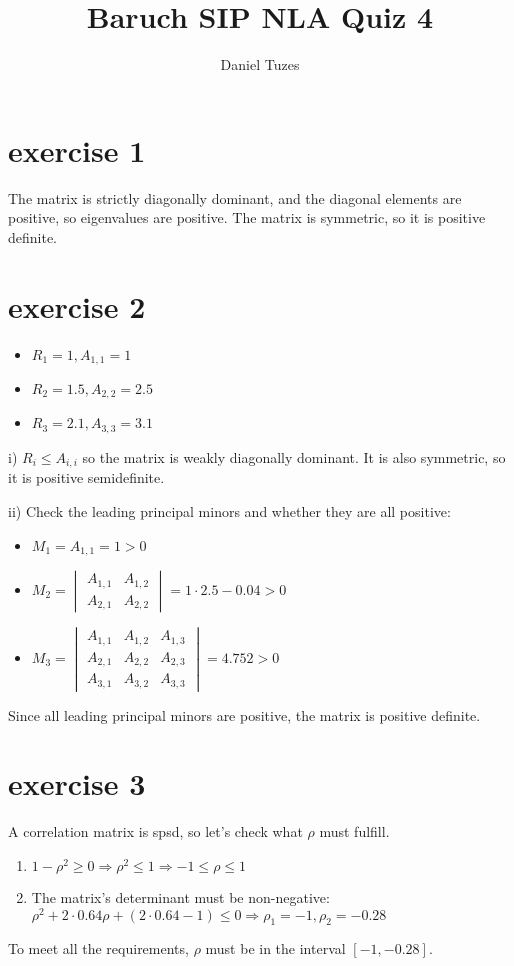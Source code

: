 \documentclass{article}
\title{Baruch SIP NLA Quiz 4}
\author{Daniel Tuzes}
\begin{document}
\maketitle

\section{exercise 1}
The matrix is strictly diagonally dominant, and the diagonal elements are positive, so eigenvalues are positive. The matrix is symmetric, so it is positive definite.

\section{exercise 2}
\begin{itemize}
    \item $R_1 = 1, A_{1,1} = 1$
    \item $R_2 = 1.5, A_{2,2} = 2.5$
    \item $R_3 = 2.1, A_{3,3} = 3.1$
\end{itemize}
i) $R_i \le A_{i,i}$ so the matrix is weakly diagonally dominant. It is also symmetric, so it is positive semidefinite.

ii) Check the leading principal minors and whether they are all positive:
\begin{itemize}
    \item $M_1 = A_{1,1} = 1 > 0$
    \item $M_2 = \begin{vmatrix}
                  A_{1,1} & A_{1,2} \\
                  A_{2,1} & A_{2,2}
              \end{vmatrix} = 1 \cdot 2.5 - 0.04 > 0$
    \item $M_3 = \begin{vmatrix}
                  A_{1,1} & A_{1,2} & A_{1,3} \\
                  A_{2,1} & A_{2,2} & A_{2,3} \\
                  A_{3,1} & A_{3,2} & A_{3,3}
              \end{vmatrix} = 4.752 > 0$
\end{itemize}
Since all leading principal minors are positive, the matrix is positive definite.

\section{exercise 3}
A correlation matrix is spsd, so let's check what $\rho$ must fulfill.
\begin{enumerate}
    \item $1-\rho^2 \geq 0 \Rightarrow \rho^2 \leq 1 \Rightarrow -1 \leq \rho \leq 1$
    \item The matrix's determinant must be non-negative:
          $\rho^2 + 2\cdot0.64\rho + (2\cdot0.64-1) \leq 0 \Rightarrow \rho_1 = -1, \rho_2 = -0.28$
\end{enumerate}
To meet all the requirements, $\rho$ must be in the interval $[-1, -0.28]$.
\end{document}
